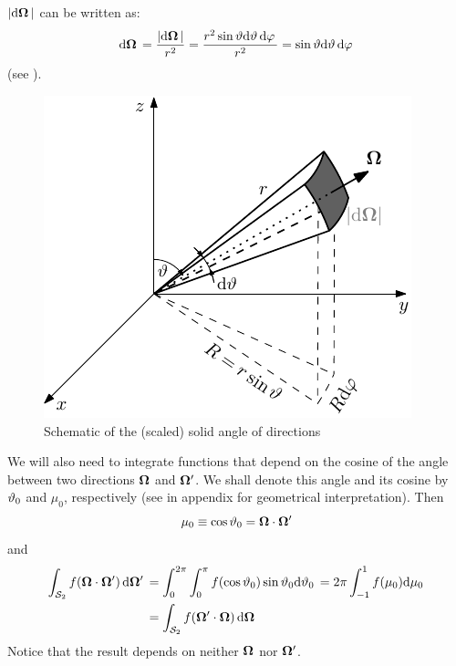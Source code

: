 $\abs{\d{\bomega}}$ can be written as:
$$
	\d{\bomega} = \frac{\abs{\d{\bomega}}}{r^2} = \frac{r^2 \sint \d{\polar}\d{\azimuthal}}{r^2} =  \sint
	\d{\polar}\d{\azimuthal} $$
(see ).
\begin{figure}[!hbt]
    \centering
    \includegraphics[scale=1.275]{element}
    \caption[Solid angle]{Schematic of the (scaled) solid angle of directions}
    \label{fig:element}
\end{figure}
We will also need to integrate functions that depend on the cosine of the angle between two 
directions $\bomega$ and $\bomega'$. We shall denote this angle and its cosine by $\polar_0$ and $\mu_0$, respectively
(see  in appendix for geometrical interpretation).
Then
$$
	\mu_0 \equiv \cos \polar_0 = \bomega\cdot\bomega'
$$
and
\begin{equation}\label{eq:invint}
\begin{aligned}
	\intA[']{f(\bomega\cdot\bomega')} &= \int_{0}^{2\pi} \int_{0}^{\pi}
		f(\cos \polar_0) \sin \polar_0\d{\polar_0} = 2\pi \muint[_0]{f(\mu_0)}\\
		&= \intA{f(\bomega'\cdot\bomega)}
\end{aligned}
\end{equation}
Notice that the result depends on neither $\bomega$ nor $\bomega'$.

